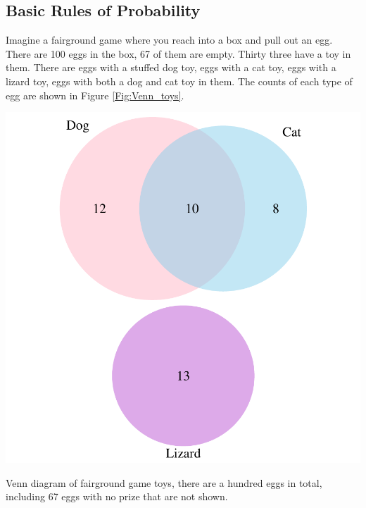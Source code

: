 \subsection{Basic Rules of Probability}
Imagine a fairground game where you reach into a box and pull out an
egg. There are 100 eggs in the box, 67 of them are empty. Thirty three have a toy in them.
There are eggs with a stuffed dog toy, eggs with a cat toy, eggs with
a lizard toy, eggs with both a dog and cat toy in them. The counts of
each type of egg are shown in Figure \ref{Fig:Venn_toys}.


 \begin{marginfigure}
 \begin{center}
   \includegraphics[width=\textwidth]{math_background/dist_pics/Venn_toys.pdf}\end{center}
 \caption{Venn diagram of fairground game toys, there are a hundred
   eggs in total, including 67 eggs with no prize that are not shown. }\label{Fig:Venn_toys}
 \end{marginfigure}

